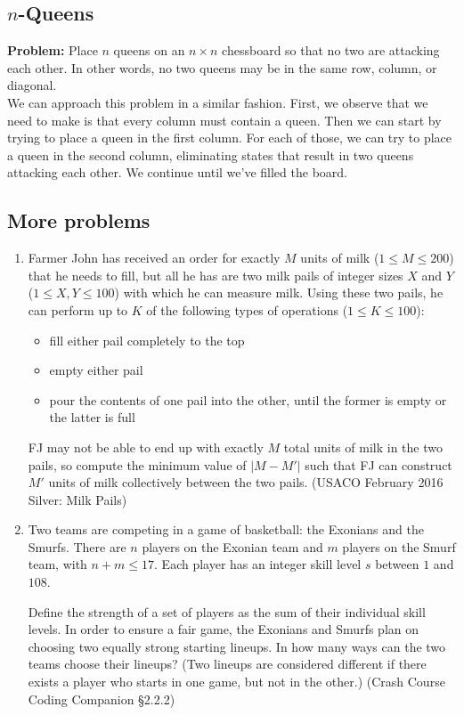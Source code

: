 \documentclass{article}
\begin{document}
\subsection{$n$-Queens}

\textbf{Problem:} Place $n$ queens on an $n \times n$ chessboard so that no two are attacking each other. In other words, no two queens may be in the same row, column, or diagonal.\\

\noindent We can approach this problem in a similar fashion. First, we observe that we need to make is that every column must contain a queen. Then we can start by trying to place a queen in the first column. For each of those, we can try to place a queen in the second column, eliminating states that result in two queens attacking each other. We continue until we've filled the board.

\subsection{More problems}

\begin{enumerate}
    \item Farmer John has received an order for exactly $M$ units of milk ($1 \le M \le 200$) that he needs to fill, but all he has are two milk pails of integer sizes $X$ and $Y$ ($1 \le X,Y \le 100$) with which he can measure milk. Using these two pails, he can perform up to $K$ of the following types of operations ($1 \le K \le 100$):
    
    \begin{itemize}
        \item fill either pail completely to the top
        \item empty either pail
        \item pour the contents of one pail into the other, until the former is empty or the latter is full
    \end{itemize}
    
    FJ may not be able to end up with exactly $M$ total units of milk in the two pails, so compute the minimum value of $|M - M'|$ such that FJ can construct $M'$ units of milk collectively between the two pails. (USACO February 2016 Silver: Milk Pails)

    \item Two teams are competing in a game of basketball: the Exonians and the Smurfs. There are $n$ players on the Exonian team and $m$ players on the Smurf team, with $n+m \le 17$. Each player has an integer skill level $s$ between $1$ and $108$.

    Define the strength of a set of players as the sum of their individual skill levels. In order to ensure a fair game, the Exonians and Smurfs plan on choosing two equally strong starting lineups. In how many ways can the two teams choose their lineups? (Two lineups are considered different if there exists a player who starts in one game, but not in the other.) (Crash Course Coding Companion \S2.2.2)
\end{enumerate}
\end{document}
